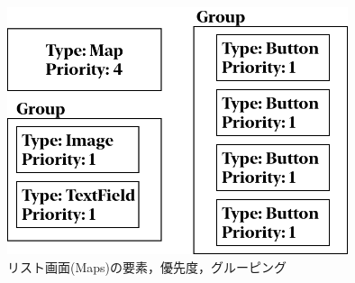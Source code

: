 \begin{figure}[htbp]
  \begin{minipage}{\hsize}
    \begin{center}
       \includegraphics[width=100mm]{img/Maps_ViewStructure.png}
    \end{center}
    \caption{リスト画面(Maps)の要素，優先度，グルーピング}
    \label{fig:Maps_ViewStructure}
  \end{minipage}
\end{figure}


